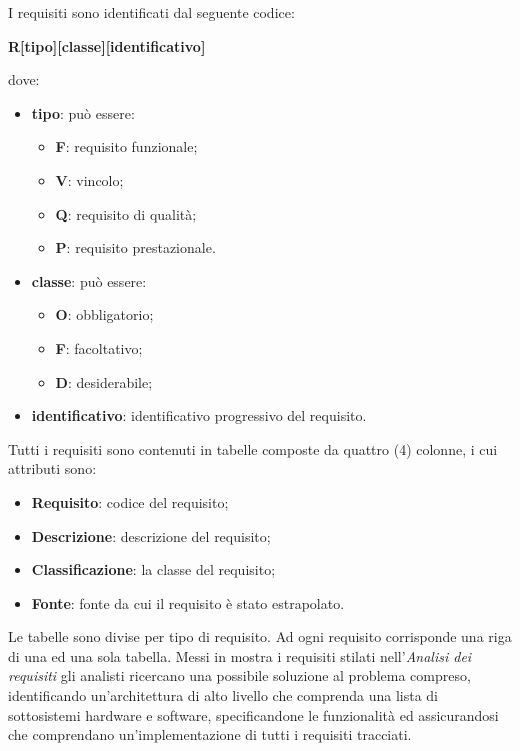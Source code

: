 	    I requisiti sono identificati dal seguente codice:\\
	    \centerline{\textbf{R[tipo][classe][identificativo]}}
	    dove:
	    \begin{itemize}
	        \item \textbf{tipo}: può essere:
	        \begin{itemize}
	            \item \textbf{F}: requisito funzionale;
	            \item \textbf{V}: vincolo;
	            \item \textbf{Q}: requisito di qualità;
	            \item \textbf{P}: requisito prestazionale. 
	        \end{itemize}
	        \item \textbf{classe}: può essere:
	        \begin{itemize}
	            \item \textbf{O}: obbligatorio;
	            \item \textbf{F}: facoltativo;
	            \item \textbf{D}: desiderabile;
	        \end{itemize}
	        \item \textbf{identificativo}: identificativo progressivo del requisito.
	    \end{itemize}
	    Tutti i requisiti sono contenuti in tabelle composte da quattro (4) colonne, i cui attributi sono:
	    \begin{itemize}
	        \item \textbf{Requisito}: codice del requisito;
	        \item \textbf{Descrizione}: descrizione del requisito;
	        \item \textbf{Classificazione}: la classe del requisito;
	        \item \textbf{Fonte}: fonte da cui il requisito è stato estrapolato.
	    \end{itemize}
	    Le tabelle sono divise per tipo di requisito. Ad ogni requisito corrisponde una riga di una ed una sola tabella.
		Messi in mostra i requisiti stilati nell'\textit{Analisi dei requisiti} gli analisti ricercano una possibile soluzione al problema compreso, identificando un'architettura di alto livello che comprenda una lista di sottosistemi hardware e software, specificandone le funzionalità ed assicurandosi che comprendano un'implementazione di tutti i requisiti tracciati.
